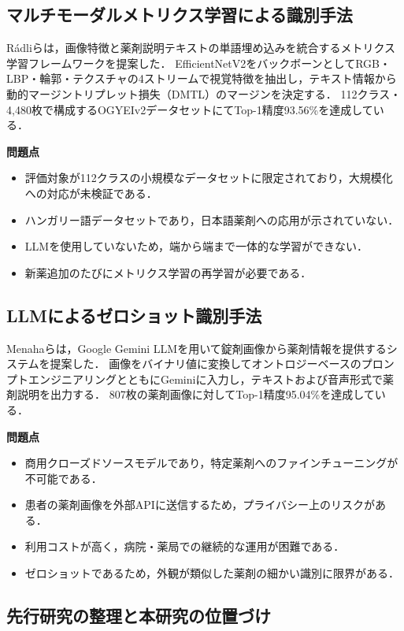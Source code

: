 \documentclass{ltjsarticle}
\begin{document}
\subsection{マルチモーダルメトリクス学習による識別手法}

Rádliら\cite{radli2024metric}は，画像特徴と薬剤説明テキストの単語埋め込みを統合するメトリクス学習フレームワークを提案した．
EfficientNetV2をバックボーンとしてRGB・LBP・輪郭・テクスチャの4ストリームで視覚特徴を抽出し，テキスト情報から動的マージントリプレット損失（DMTL）のマージンを決定する．
112クラス・4,480枚で構成するOGYEIv2データセットにてTop-1精度93.56\%を達成している．

\textbf{問題点}
\begin{itemize}
  \item 評価対象が112クラスの小規模なデータセットに限定されており，大規模化への対応が未検証である．
  \item ハンガリー語データセットであり，日本語薬剤への応用が示されていない．
  \item LLMを使用していないため，端から端まで一体的な学習ができない．
  \item 新薬追加のたびにメトリクス学習の再学習が必要である．
\end{itemize}

\subsection{LLMによるゼロショット識別手法}

Menahaら\cite{gemini2024pill}は，Google Gemini LLMを用いて錠剤画像から薬剤情報を提供するシステムを提案した．
画像をバイナリ値に変換してオントロジーベースのプロンプトエンジニアリングとともにGeminiに入力し，テキストおよび音声形式で薬剤説明を出力する．
807枚の薬剤画像に対してTop-1精度95.04\%を達成している．

\textbf{問題点}
\begin{itemize}
  \item 商用クローズドソースモデルであり，特定薬剤へのファインチューニングが不可能である．
  \item 患者の薬剤画像を外部APIに送信するため，プライバシー上のリスクがある．
  \item 利用コストが高く，病院・薬局での継続的な運用が困難である．
  \item ゼロショットであるため，外観が類似した薬剤の細かい識別に限界がある．
\end{itemize}

\subsection{先行研究の整理と本研究の位置づけ}
\end{document}
